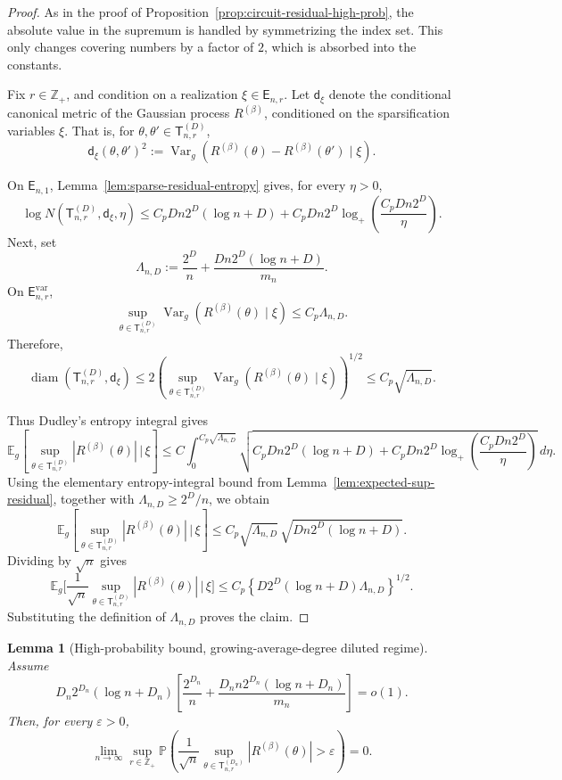 \documentclass[12pt]{article}
\newtheorem{lemma}[theorem]{Lemma}
\newcommand{\E}{\mathbb{E}}
\newcommand{\tvar}{\operatorname{Var}}
\begin{document}
\begin{proof}
As in the proof of Proposition~\ref{prop:circuit-residual-high-prob}, the
absolute value in the supremum is handled by symmetrizing the index set. This
only changes covering numbers by a factor of \(2\), which is absorbed into the
constants.

Fix \(r\in\mathbb Z_+\), and condition on a realization
\(\xi\in\mathsf E_{n,r}\). Let \(\mathsf d_\xi\) denote the conditional
canonical metric of the Gaussian process \(R^{(\beta)}\), conditioned on the
sparsification variables \(\xi\). That is, for
\(\theta,\theta'\in\mathsf{T}_{n,r}^{(D)}\),
\[
\mathsf{d}_\xi(\theta,\theta')^2
:=
\tvar_g
\left(
R^{(\beta)}(\theta)-R^{(\beta)}(\theta')
\mid \xi
\right).
\]

On \(\mathsf E_{n,1}\), Lemma~\ref{lem:sparse-residual-entropy} gives, for
every \(\eta>0\),
\[
\log N(\mathsf{T}_{n,r}^{(D)},\mathsf{d}_\xi,\eta)
\le
C_pDn2^D(\log n+D)
+
C_pDn2^D
\log_+\left(
\frac{C_pDn2^D}{\eta}
\right).
\]
Next, set
\[
\Lambda_{n,D}
:=
\frac{2^D}{n}
+
\frac{Dn2^D(\log n+D)}{m_n}.
\]
On \(\mathsf E_{n,r}^{\mathrm{var}}\),
\[
\sup_{\theta\in\mathsf{T}_{n,r}^{(D)}}
\tvar_g
\left(
R^{(\beta)}(\theta)\mid \xi
\right)
\le
C_p\Lambda_{n,D}.
\]
Therefore,
\[
\operatorname{diam}(\mathsf{T}_{n,r}^{(D)},\mathsf d_\xi)
\le
2\left(
\sup_{\theta\in\mathsf{T}_{n,r}^{(D)}}
\tvar_g(R^{(\beta)}(\theta)\mid\xi)
\right)^{1/2}
\le
C_p\sqrt{\Lambda_{n,D}}.
\]

Thus Dudley's entropy integral gives
\[
\E_g
\left[
\sup_{\theta\in\mathsf{T}_{n,r}^{(D)}}|R^{(\beta)}(\theta)|
\,\big|\,\xi
\right]
\le
C
\int_0^{C_p\sqrt{\Lambda_{n,D}}}
\sqrt{
C_pDn2^D(\log n+D)
+
C_pDn2^D
\log_+\left(
\frac{C_pDn2^D}{\eta}
\right)
}
\,d\eta .
\]
Using the elementary entropy-integral bound from
Lemma~\ref{lem:expected-sup-residual}, together with
\(\Lambda_{n,D}\ge 2^D/n\), we obtain
\[
\E_g
\left[
\sup_{\theta\in\mathsf{T}_{n,r}^{(D)}}|R^{(\beta)}(\theta)|
\,\big|\,\xi
\right]
\le
C_p
\sqrt{\Lambda_{n,D}}\,
\sqrt{Dn2^D(\log n+D)}.
\]
Dividing by \(\sqrt n\) gives
\[
\E_g
\bigg[
\frac1{\sqrt n}
\sup_{\theta\in\mathsf{T}_{n,r}^{(D)}}
|R^{(\beta)}(\theta)|
\,\big | \, \xi
\bigg]
\le
C_p
\left\{
D2^D(\log n+D)\Lambda_{n,D}
\right\}^{1/2}.
\]
Substituting the definition of \(\Lambda_{n,D}\) proves the claim.
\end{proof}

\begin{lemma}[High-probability bound, growing-average-degree diluted regime]
\label{lem:sparse-residual-negligibility}
Assume
\[
D_n2^{D_n}(\log n+D_n)
\left[
\frac{2^{D_n}}{n}
+
\frac{D_n n2^{D_n}(\log n+D_n)}{m_n}
\right]
=o(1).
\]
Then, for every \(\varepsilon>0\),
\[
\lim_{n\to\infty}
\sup_{r\in\mathbb Z_+}
\mathbb P\left(
\frac1{\sqrt n}
\sup_{\theta\in\mathsf{T}_{n,r}^{(D_n)}}
|R^{(\beta)}(\theta)|
>\varepsilon
\right)
=0.
\]
\end{lemma}
\end{document}
